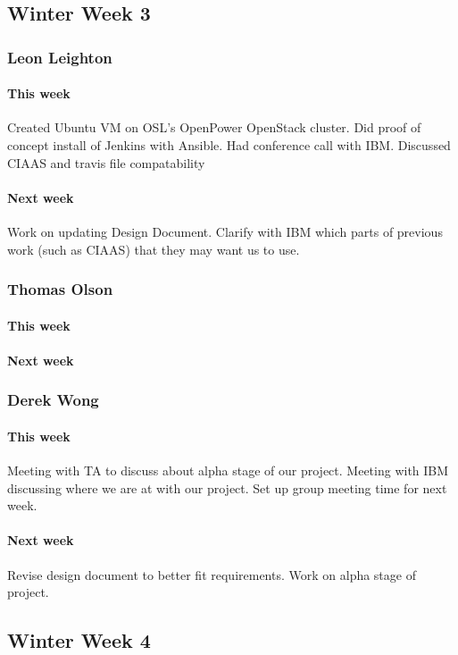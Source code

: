 \documentclass[10pt,letterpaper,onecolumn,draftclsnofoot]{IEEEtran}
\begin{document}
\subsection{Winter Week 3}
\subsubsection{Leon Leighton}
\paragraph{This week}Created Ubuntu VM on OSL's OpenPower OpenStack cluster.  
Did proof of concept install of Jenkins with Ansible.  
Had conference call with IBM. Discussed CIAAS and travis file compatability 
\paragraph{Next week}Work on updating Design Document. 
Clarify with IBM which parts of previous work (such as CIAAS) that they may want us to use.


\subsubsection{Thomas Olson}
\paragraph{This week}
\paragraph{Next week}


\subsubsection{Derek Wong}
\paragraph{This week}Meeting with TA to discuss about alpha stage of our project.  
Meeting with IBM discussing where we are at with our project.   
Set up group meeting time for next week.
\paragraph{Next week}Revise design document to better fit requirements.   
Work on alpha stage of project.


\subsection{Winter Week 4}
\end{document}
